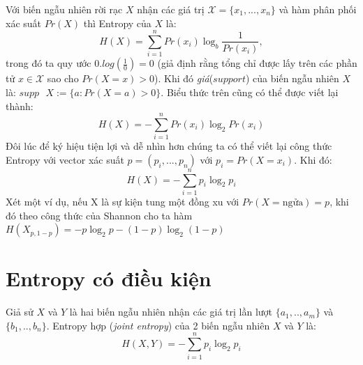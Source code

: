 \documentclass[a4paper, 12pt]{report}
\begin{document}
Với biến ngẫu nhiên rời rạc  $X$ nhận các giá trị $\mathscr{X}=\{x_{1},...,x_{n}\}$ và hàm phân phối xác suất $Pr(X)$ thì Entropy của $X$ là:
\begin{equation*}
H(X) = \displaystyle \sum_{i=1}^{n}Pr(x_i)\log_{b}\frac{1}{Pr(x_i)},
\end{equation*}
trong đó ta quy ước $0.log(\frac{1}{0}) = 0$ (giả định rằng tổng chỉ được lấy trên các phần tử $x \in \mathscr{X}$ sao cho $Pr(X=x)>0$). Khi đó \textit{giá}($support$) của biến ngẫu nhiên $X$ là: $supp\textrm{ }X := \{a: Pr(X=a) > 0\}$. Biểu thức trên cũng có thể được viết lại thành: 
\begin{equation*}
H(X) = -\displaystyle \sum_{i=1}^{n}Pr(x_i)\log_{2}Pr(x_i)
\end{equation*}
Đôi lúc để ký hiệu tiện lợi và dễ nhìn hơn chúng ta có thể viết lại công thức Entropy với vector xác suất $p=(p_i,...,p_n)$ với $p_i = Pr(X=x_i)$. Khi đó:
\begin{equation*}
H(X) = -\displaystyle \sum_{i=1}^{n}p_i\log_{2}p_i
\end{equation*}
Xét một ví dụ, nếu X là sự kiện tung một đồng xu với $Pr(X = \textrm{ngửa}) = p$, khi đó theo công thức của Shannon cho ta hàm $H(X_{p,1-p}) = -p\log_{2}p-(1-p)\log_{2}(1-p)$ 
\section{Entropy có điều kiện}
Giả sử $X$ và $Y$ là hai biến ngẫu nhiên nhận các giá trị lần lượt $\{a_1,..,a_m\}$ và $\{b_1,..,b_n\}$. Entropy hợp (\textit{joint entropy}) của 2 biến ngẫu nhiên $X$ và $Y$ là:
\begin{equation*}
H(X,Y) = -\displaystyle \sum_{i=1}^{n}p_i\log_{2}p_i
\end{equation*}
\end{document}

